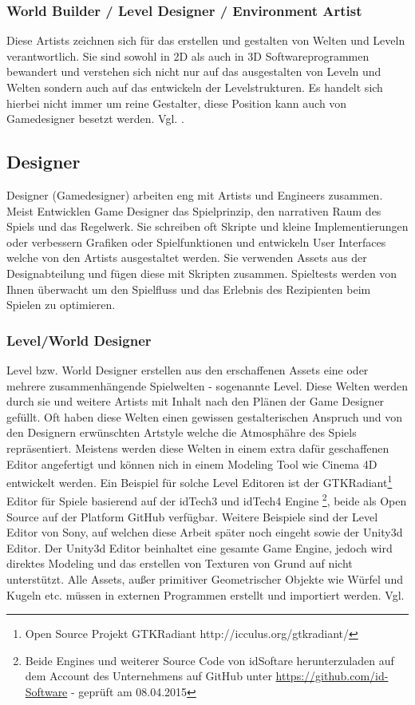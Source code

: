 \documentclass[pagesize, paper=a4, fontsize=12pt, titlepage=true, headings=small, headnosepline, abstractoff, liststotoc, nochapterprefix, plainheadsepline, twoside]{scrreprt}
\begin{document}
\subsubsection{World Builder / Level Designer / Environment Artist}
Diese Artists zeichnen sich für das erstellen und gestalten von Welten und Leveln verantwortlich. Sie sind sowohl in 2D als auch in 3D Softwareprogrammen bewandert und verstehen sich nicht nur auf das ausgestalten von Leveln und Welten sondern auch auf das entwickeln der Levelstrukturen. Es handelt sich hierbei nicht immer um reine Gestalter, diese Position kann auch von Gamedesigner besetzt werden. Vgl. \parencite[S. 24]{Chandler2006}.

\subsection{Designer}
Designer (Gamedesigner) arbeiten eng mit Artists und Engineers zusammen. Meist Entwicklen Game Designer das Spielprinzip, den narrativen Raum des Spiels und das Regelwerk. Sie schreiben oft Skripte und kleine Implementierungen oder verbessern Grafiken oder Spielfunktionen und entwickeln User Interfaces welche von den Artists ausgestaltet werden. Sie verwenden Assets aus der Designabteilung und fügen diese mit Skripten zusammen. Spieltests werden von Ihnen überwacht um den Spielfluss und das Erlebnis des Rezipienten beim Spielen zu optimieren.
\subsubsection{Level/World Designer}
Level bzw. World Designer erstellen aus den erschaffenen Assets eine oder mehrere zusammenhängende Spielwelten - sogenannte Level. Diese Welten werden durch sie und weitere Artists mit Inhalt nach den Plänen der Game Designer gefüllt. Oft haben diese Welten einen gewissen gestalterischen Anspruch und von den Designern erwünschten Artstyle welche die Atmosphähre des Spiels repräsentiert. Meistens werden diese Welten in einem extra dafür geschaffenen Editor angefertigt und können nich in einem Modeling Tool wie Cinema 4D entwickelt werden. Ein Beispiel für solche Level Editoren ist der GTKRadiant\footnote{Open Source Projekt GTKRadiant http://icculus.org/gtkradiant/} Editor für Spiele basierend auf der idTech3 und idTech4  Engine \footnote{Beide Engines und weiterer Source Code von idSoftare herunterzuladen auf dem Account des Unternehmens auf GitHub unter \url{https://github.com/id-Software} - geprüft am 08.04.2015}, beide als Open Source auf der Platform GitHub verfügbar. Weitere Beispiele sind der Level Editor von Sony, auf welchen diese Arbeit später noch eingeht sowie der Unity3d Editor. Der Unity3d Editor beinhaltet eine gesamte Game Engine, jedoch wird direktes Modeling und das erstellen von Texturen von Grund auf nicht unterstützt. Alle Assets, außer primitiver Geometrischer Objekte wie Würfel und Kugeln etc. müssen in externen Programmen erstellt und importiert werden. Vgl. \parencite[S. 31 ]{Chandler2006}
\end{document}
